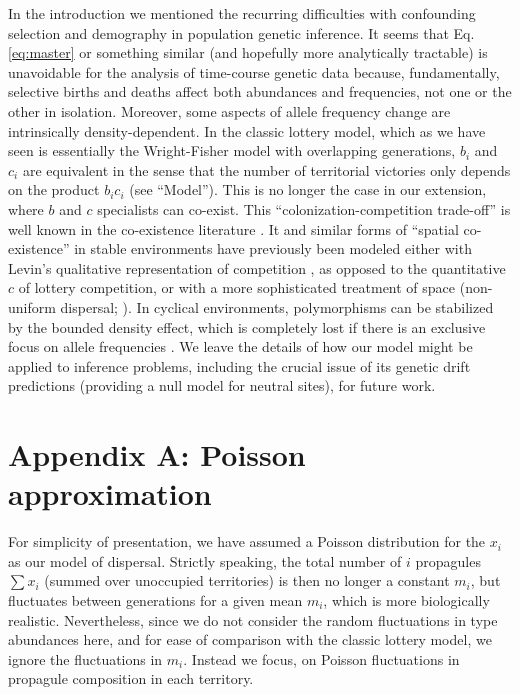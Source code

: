 \documentclass[11pt]{article}
\begin{document}
In the introduction we mentioned the recurring difficulties with confounding selection and demography in population genetic inference. It seems that Eq. \eqref{eq:master} or something similar (and hopefully more analytically tractable) is unavoidable for the analysis of time-course genetic data because, fundamentally, selective births and deaths affect both abundances and frequencies, not one or the other in isolation. Moreover, some aspects of allele frequency change are intrinsically density-dependent. In the classic lottery model, which as we have seen is essentially the Wright-Fisher model with overlapping generations, $b_i$ and $c_i$ are  equivalent in the sense that the number of territorial victories only depends on the product $b_i c_i$ (see ``Model''). This is no longer the case in our extension, where $b$ and $c$ specialists can co-exist. This ``colonization-competition trade-off'' is well known in the co-existence literature \citep{tilman_94}. It and similar forms of ``spatial co-existence'' in stable environments have previously been modeled either with Levin's  qualitative representation of competition \citep{levins_71,tilman_94}, as opposed to the quantitative $c$ of lottery competition, or with a more sophisticated treatment of space (non-uniform dispersal; \citealt{shmida_84,bolker_99}). In cyclical environments, polymorphisms can be stabilized by the bounded density effect, which is  completely lost if there is an exclusive focus on allele frequencies \citep{yi_2013}. We leave the details of how our model might be applied to inference problems, including the crucial issue of its genetic drift predictions (providing a null model for neutral sites), for future work. 




 

\section*{Appendix A: Poisson approximation}

For simplicity of presentation, we have assumed a Poisson distribution for the $x_i$ as our model of dispersal. Strictly speaking, the total number of $i$ propagules $\sum x_i$ (summed over unoccupied territories) is then no longer a constant $m_i$, but fluctuates between generations for a given mean $m_i$, which is more biologically realistic. Nevertheless, since we do not consider the random fluctuations in type abundances here, and for ease of comparison with the classic lottery model, we ignore the fluctuations in $m_i$. Instead we focus, on Poisson fluctuations in propagule composition in each territory. 
\end{document}
